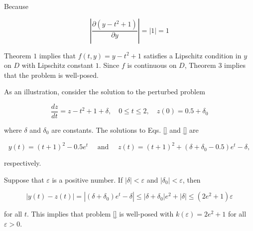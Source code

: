\begin{mysolution}
Because

$$
\left|\frac{\partial\left(y-t^{2}+1\right)}{\partial y}\right|=|1|=1
$$

Theorem $1$ implies that $f(t, y)=y-t^{2}+1$ satisfies a Lipschitz condition in $y$ on $D$ with Lipschitz constant $1$. Since $f$ is continuous on $D$, Theorem $3$ implies that the problem is well-posed.

As an illustration, consider the solution to the perturbed problem


\begin{equation}\label{eqn:ivpeam3eq1}
\frac{d z}{d t}=z-t^{2}+1+\delta, \quad 0 \leq t \leq 2, \quad z(0)=0.5+\delta_{0}
\end{equation}

where $\delta$ and $\delta_{0}$ are constants. The solutions to Eqs. \ref{} and \ref{} are

$$
y(t)=(t+1)^{2}-0.5 e^{t} \quad \text { and } \quad z(t)=(t+1)^{2}+\left(\delta+\delta_{0}-0.5\right) e^{t}-\delta,
$$

respectively.

Suppose that $\varepsilon$ is a positive number. If $|\delta|<\varepsilon$ and $\left|\delta_{0}\right|<\varepsilon$, then

$$
|y(t)-z(t)|=\left|\left(\delta+\delta_{0}\right) e^{t}-\delta\right| \leq\left|\delta+\delta_{0}\right| e^{2}+|\delta| \leq\left(2 e^{2}+1\right) \varepsilon
$$

for all $t$. This implies that problem \ref{} is well-posed with $k(\varepsilon)=2 e^{2}+1$ for all $\varepsilon>0$.
\end{mysolution}
%
%
%
%
